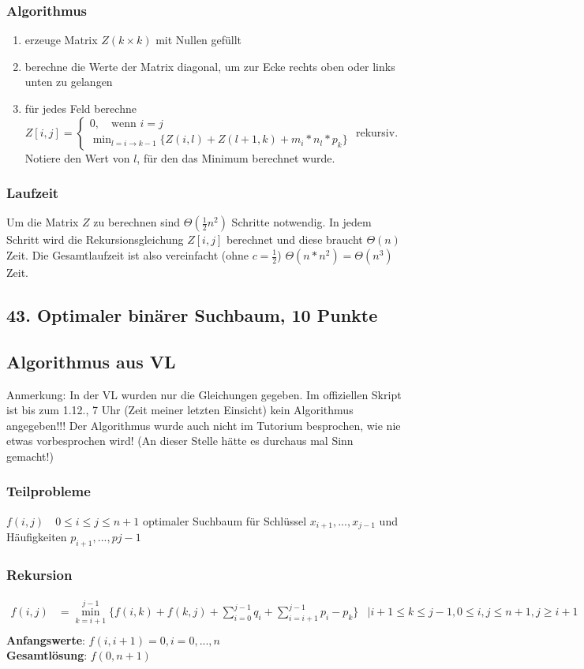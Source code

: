 \documentclass[ngerman,a4paper]{report}
\begin{document}
\subsubsection*{Algorithmus}
\begin{enumerate}
\item erzeuge Matrix $Z (k \times k)$ mit Nullen gefüllt
\item berechne die Werte der Matrix diagonal, um zur Ecke rechts oben oder links unten zu gelangen 
\item für jedes Feld berechne $Z[i,j] = \begin{cases} 0, \quad\text{wenn } i = j \\ \min_{l = i \rightarrow k-1}\{Z(i,l) + Z(l+1,k) + m_i * n_l * p_k \}\end{cases}$ rekursiv. Notiere den Wert von $l$, für den das Minimum berechnet wurde.
\end{enumerate}
\subsubsection*{Laufzeit}
Um die Matrix $Z$ zu berechnen sind $\Theta(\frac{1}{2}n^2)$ Schritte notwendig. In jedem Schritt wird die Rekursionsgleichung $Z[i,j]$ berechnet und diese braucht $\Theta(n)$ Zeit. Die Gesamtlaufzeit ist also vereinfacht (ohne $c=\frac{1}{2}$) $\Theta(n*n^2) = \Theta(n^3)$ Zeit.
\subsection*{43. Optimaler binärer Suchbaum, 10 Punkte}
\subsection*{Algorithmus aus VL}
Anmerkung: In der VL wurden nur die Gleichungen gegeben. Im offiziellen Skript ist bis zum 1.12., 7 Uhr (Zeit meiner letzten Einsicht) kein Algorithmus angegeben!!! Der Algorithmus wurde auch nicht im Tutorium besprochen, wie nie etwas vorbesprochen wird! (An dieser Stelle hätte es durchaus mal Sinn gemacht!)
\subsubsection*{Teilprobleme}
$f(i,j)\quad 0\leq i \leq j \leq n+1$ optimaler Suchbaum für Schlüssel $x_{i+1}, ... , x_{j-1}$ und Häufigkeiten $p_{i+1},...,p{j-1}$
\subsubsection*{Rekursion}
\begin{align*}
f(i,j) &= \min_{k = i+1}^{j-1} \{ f(i,k) + f(k,j) + \sum_{i=0}^{j-1}q_i + \sum_{i = i+1}^{j-1} p_{i} - p_{k} \}&| i+1\leq k \leq j-1, 0 \leq i, j \leq n+1, j \geq i+1\\
\end{align*}
\textbf{Anfangswerte}: $f(i, i+1) = 0, i = 0,...,n$\\
\textbf{Gesamtlösung}: $f(0,n+1)$ \\
\end{document}
